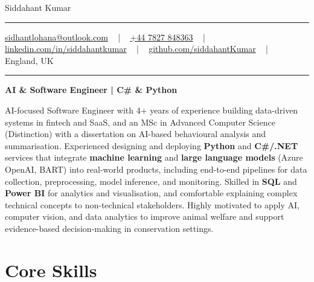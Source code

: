 \documentclass[letterpaper,10pt]{article}
\newcommand{\documentTitle}[2]{
  \begin{center}
    \vspace*{-0.3in}
    {\Huge\color{accentTitle} #1}
    \vspace{8pt}
    {\color{accentLine} \hrule}
    \vspace{2pt}
    \footnotesize{#2}
    \vspace{2pt}
    {\color{accentLine} \hrule}
  \end{center}
}
\begin{document}
\documentTitle{Siddahant Kumar}{
\vspace{0.1cm}
\href{mailto:sidhantlohana@outlook.com}{sidhantlohana@outlook.com} ~ | ~
\href{tel:+447827848363}{+44 7827 848363} ~ | ~
\href{https://www.linkedin.com/in/siddahantkumar/}{linkedin.com/in/siddahantkumar} ~ | ~
\href{https://github.com/siddahantKumar}{github.com/siddahantKumar} ~ | ~
England, UK
}

\begin{center}
\textbf{AI \& Software Engineer | C\# \& Python}
\end{center}

AI-focused Software Engineer with 4+ years of experience building data-driven systems in fintech and SaaS, and an MSc in Advanced Computer Science (Distinction) with a dissertation on AI-based behavioural analysis and summarisation. Experienced designing and deploying \textbf{Python} and \textbf{C\#/.NET} services that integrate \textbf{machine learning} and \textbf{large language models} (Azure OpenAI, BART) into real-world products, including end-to-end pipelines for data collection, preprocessing, model inference, and monitoring. Skilled in \textbf{SQL} and \textbf{Power BI} for analytics and visualisation, and comfortable explaining complex technical concepts to non-technical stakeholders. Highly motivated to apply AI, computer vision, and data analytics to improve animal welfare and support evidence-based decision-making in conservation settings.


\section{Core Skills}
\end{document}
